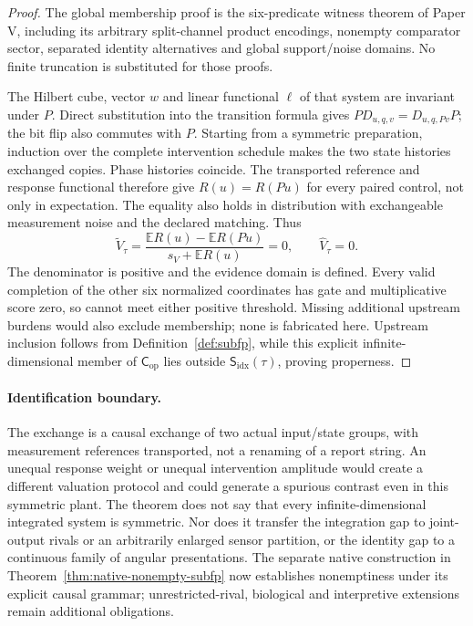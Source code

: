\documentclass[11pt,a4paper]{article}
\theoremstyle{definition}
\newcommand{\Cop}{\mathsf{C}_{\mathrm{op}}}
\newcommand{\Subfp}{\mathsf{S}_{\mathrm{idx}}}
\newcommand{\ValAsym}{V}
\begin{document}
\begin{proof}
The global membership proof is the six-predicate witness theorem of Paper V, including its arbitrary split-channel product encodings, nonempty comparator sector, separated identity alternatives and global support/noise domains. No finite truncation is substituted for those proofs.

The Hilbert cube, vector $w$ and linear functional $\ell$ of that system are invariant under $P$. Direct substitution into the transition formula gives $P D_{u,q,v}=D_{u,q,Pv}P$; the bit flip also commutes with $P$. Starting from a symmetric preparation, induction over the complete intervention schedule makes the two state histories exchanged copies. Phase histories coincide. The transported reference and response functional therefore give $R(u)=R(Pu)$ for every paired control, not only in expectation. The equality also holds in distribution with exchangeable measurement noise and the declared matching. Thus
\[
 \widetilde{\ValAsym}_\tau=
 \frac{\mathbb E R(u)-\mathbb E R(Pu)}{s_V+\mathbb E R(u)}=0,
 \qquad \widehat{\ValAsym}_\tau=0.
\]
The denominator is positive and the evidence domain is defined. Every valid completion of the other six normalized coordinates has gate and multiplicative score zero, so cannot meet either positive threshold. Missing additional upstream burdens would also exclude membership; none is fabricated here. Upstream inclusion follows from Definition~\ref{def:subfp}, while this explicit infinite-dimensional member of $\Cop$ lies outside $\Subfp(\tau)$, proving properness.
\end{proof}

\paragraph{Identification boundary.}
The exchange is a causal exchange of two actual input/state groups, with measurement references transported, not a renaming of a report string. An unequal response weight or unequal intervention amplitude would create a different valuation protocol and could generate a spurious contrast even in this symmetric plant. The theorem does not say that every infinite-dimensional integrated system is symmetric. Nor does it transfer the integration gap to joint-output rivals or an arbitrarily enlarged sensor partition, or the identity gap to a continuous family of angular presentations. The separate native construction in Theorem~\ref{thm:native-nonempty-subfp} now establishes nonemptiness under its explicit causal grammar; unrestricted-rival, biological and interpretive extensions remain additional obligations.
\end{document}
